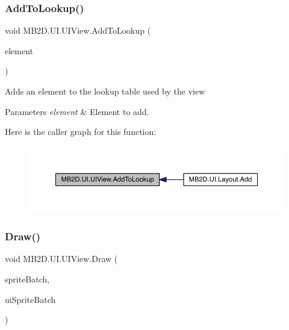 \subsubsection{\texorpdfstring{Add\+To\+Lookup()}{AddToLookup()}}
{\footnotesize\ttfamily void M\+B2\+D.\+U\+I.\+U\+I\+View.\+Add\+To\+Lookup (\begin{DoxyParamCaption}\item[{\hyperlink{class_m_b2_d_1_1_u_i_1_1_u_i_element}{U\+I\+Element}}]{element }\end{DoxyParamCaption})\hspace{0.3cm}{\ttfamily [inline]}}



Adds an element to the lookup table used by the view 


\begin{DoxyParams}{Parameters}
{\em element} & Element to add.\\
\hline
\end{DoxyParams}
Here is the caller graph for this function\+:
\nopagebreak
\begin{figure}[H]
\begin{center}
\leavevmode
\includegraphics[width=350pt]{class_m_b2_d_1_1_u_i_1_1_u_i_view_aad1fdbf0c8a8d94cb57fff8b5ff43ec8_icgraph}
\end{center}
\end{figure}
\hypertarget{class_m_b2_d_1_1_u_i_1_1_u_i_view_a1f1acf013f17aa0738ff2d9b0516126e}{}\label{class_m_b2_d_1_1_u_i_1_1_u_i_view_a1f1acf013f17aa0738ff2d9b0516126e} 
\subsubsection{\texorpdfstring{Draw()}{Draw()}}
{\footnotesize\ttfamily void M\+B2\+D.\+U\+I.\+U\+I\+View.\+Draw (\begin{DoxyParamCaption}\item[{Sprite\+Batch}]{sprite\+Batch,  }\item[{Sprite\+Batch}]{ui\+Sprite\+Batch }\end{DoxyParamCaption})\hspace{0.3cm}{\ttfamily [inline]}}




